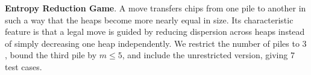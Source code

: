 \documentclass[review]{elsarticle}
\newcommand{\set}[1]{\{ #1 \}}
\newcommand{\tuple}[1]{\langle {#1} \rangle}
\newcommand{\true}{\top}
\newcommand{\statevar}{\mathcal{X}}
\newcommand{\act}{\mathcal{A}}
\newcommand{\constraint}{\mathcal{C}}
\newcommand{\estate}{\mathcal{E}}
\newcommand{\pre}{\mathtt{pre}}
\newcommand{\eff}{\mathtt{eff}}
\begin{document}
\textbf{Entropy Reduction Game}. A move transfers chips from one pile to another in such a way that the heaps become more nearly equal in size.
Its characteristic feature is that a legal move is guided by reducing dispersion across heaps instead of simply decreasing one heap independently.
We restrict the number of piles to $3$, bound the third pile by $m \le 5$, and include the unrestricted version, giving $7$ test cases.
\end{document}
